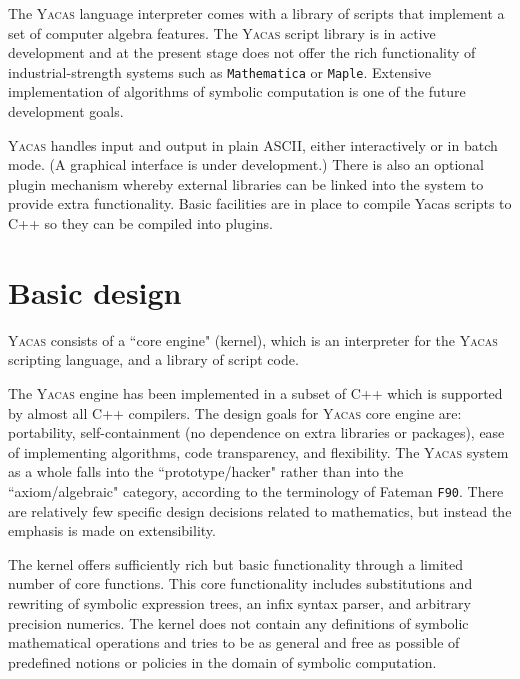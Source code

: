 \documentclass{llncs}
\begin{document}
The \textsc{Yacas} language interpreter comes with a library of scripts that implement a set of computer algebra features. The \textsc{Yacas} script library
is in active development and at the present stage does not offer the rich functionality of
industrial-strength systems such as \small{\texttt{Mathematica}} or \small{\texttt{Maple}}.
Extensive
implementation of algorithms of symbolic computation is one of the future
development goals.

\textsc{Yacas} handles input and output in plain ASCII,
either interactively or in batch mode. (A graphical interface is under development.) There is also an optional plugin mechanism
whereby external libraries can be linked into the system to provide extra
functionality. Basic facilities are in place to compile Yacas scripts
to C++ so they can be compiled into plugins.

\section{%
Basic design}
\textsc{Yacas} consists of a ``core engine" (kernel), which is an interpreter
for the \textsc{Yacas} scripting language, and a library of script code.

The
\textsc{Yacas} engine has been implemented in a subset of C++ which is
supported by almost all C++ compilers.
The design goals for \textsc{Yacas} core engine are: portability,
self-containment (no dependence on extra libraries or packages), ease of
implementing algorithms, code transparency, and flexibility. The \textsc{Yacas}
system as a whole falls into the ``prototype/hacker" rather than into the
``axiom/algebraic" category, according to the terminology of Fateman
\small{\texttt{F90}}. There are relatively few specific design decisions related to
mathematics, but instead the emphasis is made on extensibility.

The kernel offers sufficiently rich but basic functionality through a limited
number of core functions. This core functionality includes substitutions and
rewriting of symbolic expression trees, an infix syntax parser, and arbitrary
precision numerics. The kernel does not contain any definitions of symbolic
mathematical operations and tries to be as general and free as possible of
predefined notions or policies in the domain of symbolic computation.
\end{document}
